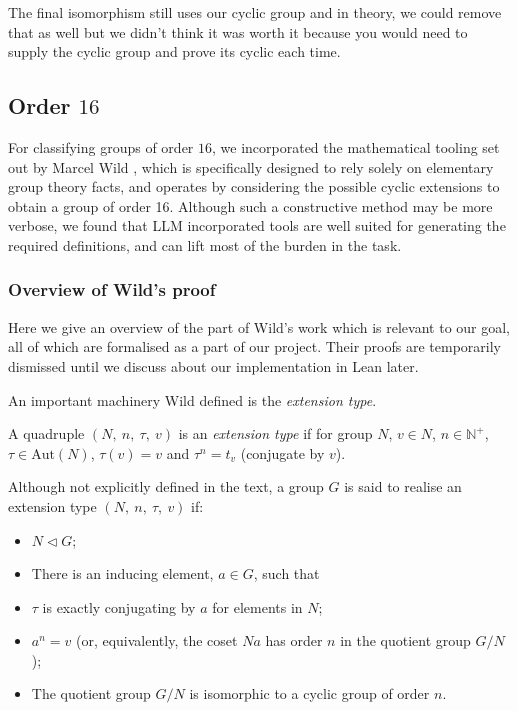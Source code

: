 \documentclass[a4paper,11pt, titlepage]{article}
\theoremstyle{remark}
\begin{document}
The final isomorphism still uses our cyclic group and in theory, we could remove that as well but we didn't think it was worth it because you would need to supply the cyclic group and prove its cyclic each time.

\subsection{Order $16$}
\label{Order $16$}

For classifying groups of order $16$, we incorporated the mathematical tooling set out by Marcel Wild \cite{wild_groups_2005}, which is specifically designed to rely solely on elementary group theory facts, and operates by considering the possible cyclic extensions to obtain a group of order 16.
Although such a constructive method may be more verbose, we found that LLM incorporated tools are well suited for generating the required definitions, and can lift most of the burden in the task.

\subsubsection{Overview of Wild's proof}

Here we give an overview of the part of Wild's work which is relevant to our goal, all of which are formalised as a part of our project. Their proofs are temporarily dismissed until we discuss about our implementation in Lean later.

An important machinery Wild defined is the \textit{extension type}.

\begin{definition}[Wild]
    A quadruple $(N,\ n,\ \tau,\ v)$ is an \textit{extension type} if for group $N$, $v \in N$, $n \in \mathbb{N}^+$,  $\tau \in \text{Aut}(N)$, $\tau (v) = v$ and $\tau^n = t_v$ (conjugate by $v$).
\end{definition}

\begin{definition}
    Although not explicitly defined in the text, a group $G$ is said to realise an extension type $(N,\ n,\ \tau,\ v)$ if:
    \begin{itemize}
        \item $N \lhd G$;
        \item There is an inducing element, $a \in G$, such that
        \item $\tau$ is exactly conjugating by $a$ for elements in $N$;
        \item $a^n = v$ (or, equivalently, the coset $Na$ has order $n$ in the quotient group $G/N$);
        \item The quotient group $G/N$ is isomorphic to a cyclic group of order $n$.
    \end{itemize}
\end{definition}
\end{document}

